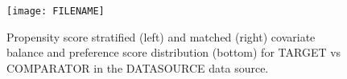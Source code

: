 \begin{figure}
	\caption{Propensity score stratified (left) and matched (right) covariate balance
	and preference score distribution (bottom) for
	TARGET vs COMPARATOR in the DATASOURCE data source.}
	\centerline{
  		\texttt{[image: FILENAME]}
  	}
\end{figure}
